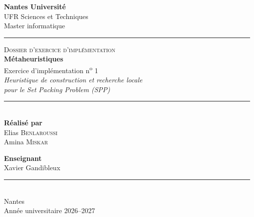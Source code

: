 \documentclass[a4paper,11pt]{article}
\begin{document}
\begin{titlepage}
    \thispagestyle{empty}

    \begin{center}

        \vspace*{1cm}

        {\Large\bfseries Nantes Université}\\[0.25cm]
        {\large UFR Sciences et Techniques}\\[0.2cm]
        {\normalsize Master informatique}\\[0.2cm]
  

        \vspace{1.8cm}

        {\color{univblue}\rule{0.75\textwidth}{1.2pt}}

        \vspace{1.8cm}

        {\large\scshape Dossier d'exercice d'implémentation}\\[0.8cm]

        {\color{univblue}\Huge\bfseries Métaheuristiques}\\[0.6cm]

        {\Large Exercice d'implémentation n\textsuperscript{o} 1}\\[0.3cm]

        {\large\itshape
        Heuristique de construction et recherche locale\\
        pour le Set Packing Problem (SPP)
        }

        \vspace{2cm}

        {\color{univblue}\rule{0.45\textwidth}{0.8pt}}\\[0.7cm]

        {\large\bfseries Réalisé par}\\[0.6cm]

        {\large Elias \textsc{Benlaroussi}}\\[0.35cm]
        {\large Amina \textsc{Miskar}}

        \vspace{1.5cm}

        {\large\bfseries Enseignant}\\[0.3cm]
        {\large Xavier Gandibleux}

        \vfill

        {\color{univblue}\rule{0.75\textwidth}{1.2pt}}\\[0.5cm]

        {\normalsize Nantes}\\[0.2cm]
        {\normalsize Année universitaire 2026--2027}

    \end{center}
\end{titlepage}




% 
% 
\end{document}
